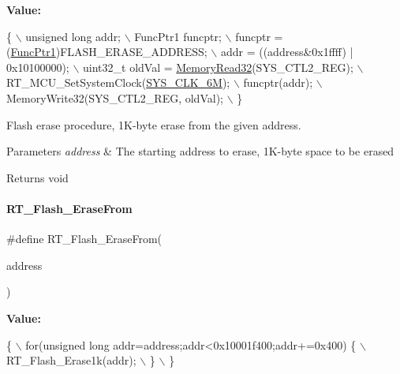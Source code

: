 {\bfseries Value\+:}
\begin{DoxyCode}
\{                                                   \(\backslash\)
        unsigned \textcolor{keywordtype}{long} addr;                             \(\backslash\)
        FuncPtr1 funcptr;                               \(\backslash\)
        funcptr =  (\mbox{\hyperlink{a00020_a0891965816a5b721b07f7bebefaf7430}{FuncPtr1}})FLASH\_ERASE\_ADDRESS;       \(\backslash\)
        addr = ((address&0x1ffff) | 0x10100000);        \(\backslash\)
        uint32\_t oldVal = \mbox{\hyperlink{a00020_a2d484dc15bdf30ee11ab3b05f31f0e16}{MemoryRead32}}(SYS\_CTL2\_REG);   \(\backslash\)
        RT\_MCU\_SetSystemClock(\mbox{\hyperlink{a00020_ae3a2d501b8662e11b969fb4a5e195e5bad1640aa8c46162a7551abca12293ef39}{SYS\_CLK\_6M}});              \(\backslash\)
        funcptr(addr);                                  \(\backslash\)
        MemoryWrite32(SYS\_CTL2\_REG, oldVal);            \(\backslash\)
    \}
\end{DoxyCode}


Flash erase procedure, 1\+K-\/byte erase from the given address. 


\begin{DoxyParams}{Parameters}
{\em address} & The starting address to erase, 1\+K-\/byte space to be erased \\
\hline
\end{DoxyParams}
\begin{DoxyReturn}{Returns}
void 
\end{DoxyReturn}
\mbox{\label{a00008_afb9cdf54d7254cfef685cd4012113b27}} 
\paragraph{\texorpdfstring{R\+T\+\_\+\+Flash\+\_\+\+Erase\+From}{RT\_Flash\_EraseFrom}}
{\footnotesize\ttfamily \#define R\+T\+\_\+\+Flash\+\_\+\+Erase\+From(\begin{DoxyParamCaption}\item[{}]{address }\end{DoxyParamCaption})}

{\bfseries Value\+:}
\begin{DoxyCode}
\{                                                                   \(\backslash\)
        for(\textcolor{keywordtype}{unsigned} \textcolor{keywordtype}{long} addr=address;addr<0x10001f400;addr+=0x400) \{  \(\backslash\)
            RT\_Flash\_Erase1k(addr);                                     \(\backslash\)
        \}                                                               \(\backslash\)
    \}
\end{DoxyCode}


